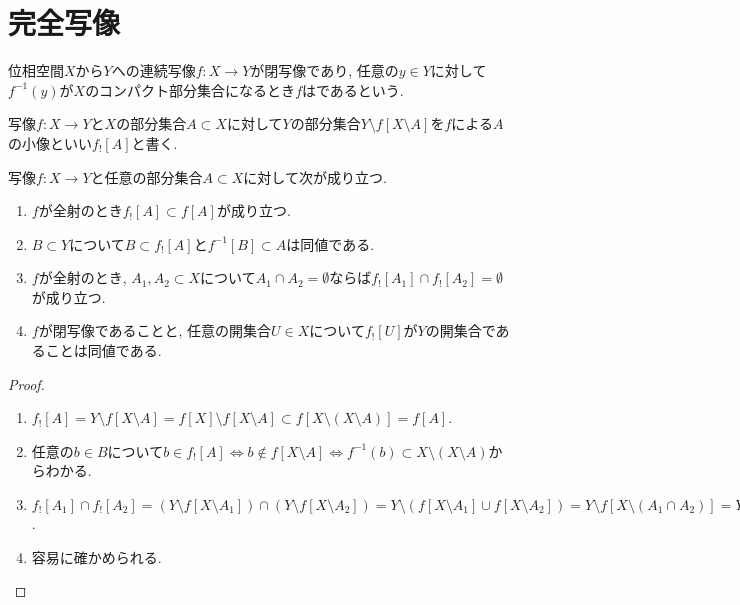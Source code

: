 \documentclass[uplatex, dvipdfmx, a4paper, 12pt, class=jsbook, crop=false]{standalone}
\begin{document}
\section{完全写像}
\label{sec:perfect-maps}

\begin{definition}
	位相空間$ X $から$ Y $への連続写像$ f \colon X \to Y $が閉写像であり, 任意の$ y \in Y $に対して$ f^{-1}(y) $が$ X $のコンパクト部分集合になるとき$ f $はであるという.
\end{definition}

\begin{definition}
	写像$ f \colon X \to Y $と$ X $の部分集合$ A \subset X $に対して$ Y $の部分集合$ Y \setminus f[X \setminus A] $を$ f $による$ A $の小像といい$ f_![A] $と書く.
\end{definition}

\begin{proposition}
	\label{lemma:Basic property of small image}
	写像$ f \colon X \to Y $と任意の部分集合$ A \subset X $に対して次が成り立つ.
	\begin{enumerate}
		\item $ f $が全射のとき$ f_![A] \subset f[A] $が成り立つ.
		\item $ B \subset Y $について$ B \subset f_![A] $と$ f^{-1}[B] \subset A $は同値である.
		\item $ f $が全射のとき, $ A_1, A_2 \subset X $について$ A_1 \cap A_2 = \emptyset $ならば$ f_![A_1] \cap f_![A_2] = \emptyset $が成り立つ.
		\item $ f $が閉写像であることと, 任意の開集合$ U \in X $について$ f_![U] $が$ Y $の開集合であることは同値である.
	\end{enumerate}
\end{proposition}

\begin{proof}
	\begin{enumerate}
		\item $ f_![A] = Y \setminus f[X \setminus A] = f[X] \setminus f[X \setminus A] \subset f[X \setminus (X \setminus A)] = f[A] $.
		\item 任意の$ b \in B $について$ b \in f_![A] \Leftrightarrow b \notin f[X \setminus A] \Leftrightarrow f^{-1}(b) \subset X \setminus (X \setminus A) $からわかる.
		\item $ f_![A_1] \cap f_![A_2] = (Y \setminus f[X \setminus A_1]) \cap (Y \setminus f[X \setminus A_2]) = Y \setminus (f[X \setminus A_1] \cup f[X \setminus A_2]) = Y \setminus f[X \setminus (A_1 \cap A_2)] = Y \setminus Y = \emptyset $.
		\item 容易に確かめられる.
	\end{enumerate}
\end{proof}
\end{document}
